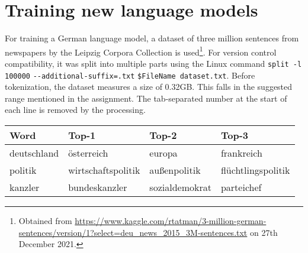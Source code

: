 \section{Training new language models}

\autocite{dataset} For training a German language model, a dataset of three million sentences from newspapers by the Leipzig Corpora Collection is used\footnote{Obtained from \url{https://www.kaggle.com/rtatman/3-million-german-sentences/version/1?select=deu_news_2015_3M-sentences.txt} on 27th December 2021.}.
For version control compatibility, it was split into multiple parts using the Linux command \verb|split -l 100000| \verb|--additional-suffix=.txt| \verb|$FileName dataset.txt|.
Before tokenization, the dataset measures a size of 0.32GB.
This falls in the suggested range mentioned in the assignment.
The tab-separated number at the start of each line is removed by the processing. 

\begin{table}[hb]
\center
\begin{tabular}{|l|l|l|l|}
\hline
\textbf{Word} & \textbf{Top-1}     & \textbf{Top-2} & \textbf{Top-3}     \\ \hline
deutschland   & österreich         & europa         & frankreich         \\ \hline
politik       & wirtschaftspolitik & außenpolitik   & flüchtlingspolitik \\ \hline
kanzler       & bundeskanzler      & sozialdemokrat & parteichef         \\ \hline
\end{tabular}
\end{table}

